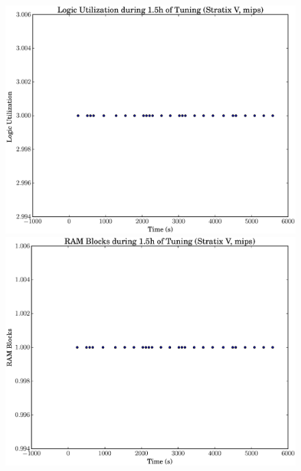 \documentclass[12pt, a4paper]{article}
\begin{document}
\begin{figure}[htpb]
    \centering
    \noindent
    \begin{minipage}{.48\textwidth}
        \centering
        \includegraphics[scale=.25]{mips_lu_5400_chstone_StratixV}
    \end{minipage}%
    \hfill
    \begin{minipage}{.48\textwidth}
        \centering
        \includegraphics[scale=.25]{mips_ram_5400_chstone_StratixV}
    \end{minipage}%


\end{figure}
\end{document}
